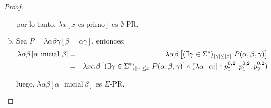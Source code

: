 \begin{proof}
\begin{enumerate}[a)]
        \PN por lo tanto, $\lambda x\left[x \text{ es primo}\right]$ es $\emptyset$-PR.

      \item Sea $P = \lambda \alpha\beta\gamma \left[\beta = \alpha\gamma\right]$, entonces:
        \begin{eqnarray*}
          \lambda \alpha\beta \left[\alpha \text{\ }\mathrm{ inicial}\ \beta \right] &=& \lambda \alpha\beta
            \left[(\exists \gamma \in \SIGMA)_{\lvert \gamma \rvert \leq \lvert \beta \rvert} \; P(\alpha, \beta,
            \gamma)\right] \\
          &=& \lambda x\alpha\beta \left[(\exists \gamma \in \SIGMA)_{\lvert \gamma \rvert \leq x} \; P(\alpha,\beta,
            \gamma)\right] \circ (\lambda \alpha \left[\lvert \alpha\rvert\right] \circ p_{2}^{0,2},p_{1}^{0,2},
            p_{2}^{0,2})
        \end{eqnarray*}

        \PN luego, $\lambda \alpha\beta \left[\alpha \text{\ }\mathrm{ inicial}\ \beta \right]$ es $\Sigma$-PR.
    \end{enumerate}
  \end{proof}

